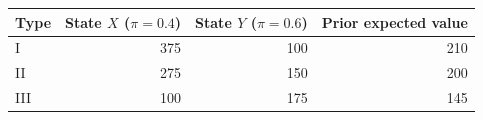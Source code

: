 \begin{tabular}{lrrr}
\toprule
Type & State $X$ ($\pi=0.4$) & State $Y$ ($\pi=0.6$) & Prior expected value \\
\midrule
I & 375 & 100 & 210 \\
II & 275 & 150 & 200 \\
III & 100 & 175 & 145 \\
\bottomrule
\end{tabular}
